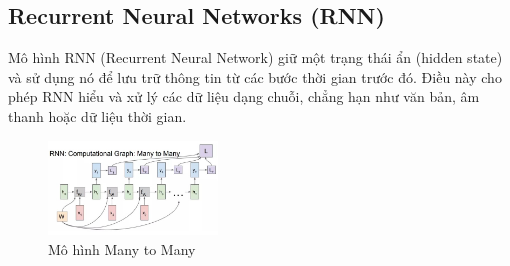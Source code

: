 \documentclass[conference]{IEEEtran}
\begin{document}
\subsection{Recurrent Neural Networks (RNN)} 
Mô hình RNN (Recurrent Neural Network) giữ một trạng thái ẩn (hidden state) và sử dụng nó để lưu trữ thông tin từ các bước thời gian trước đó. Điều này cho phép RNN hiểu và xử lý các dữ liệu dạng chuỗi, chẳng hạn như văn bản, âm thanh hoặc dữ liệu thời gian.

\begin{figure}[H]
    \centering
    \includegraphics[width=0.4\textwidth]{bibliography/pictures/RNN.jpg}
    \caption{Mô hình Many to Many}
\end{figure}
\end{document}
